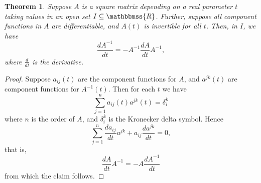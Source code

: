\documentclass[12pt]{article}
\newcommand{\R}{\mathbbmss{R}}
\newtheorem{thm}{Theorem}
\begin{document}
\begin{thm}
Suppose $A$ is a square matrix depending on a real parameter $t$
taking values in an open set $I\subseteq \R$. Further, suppose all
component functions in $A$ are differentiable, and $A(t)$ is invertible
for all $t$. Then, in $I$, we have
$$
   \frac{dA^{-1}}{dt}=-A^{-1} \frac{dA}{dt} A^{-1}, 
$$
where $\frac{d}{dt}$ is the derivative.
\end{thm}

\begin{proof}
Suppose $a_{ij}(t)$ are the component functions for $A$, 
and $a^{jk}(t)$ are component functions for $A^{-1}(t)$. Then 
for each $t$ we have 
$$
   \sum_{j=1}^n a_{ij}(t) a^{jk}(t)=\delta_i^k
$$
where $n$ is the order of $A$, and 
$\delta_i^k$ is the Kronecker delta symbol. Hence
$$
 \sum_{j=1}^n \frac{da_{ij}}{dt} a^{jk} + a_{ij}\frac{da^{jk}}{dt} = 0,
$$
that is, 
$$
  \frac{dA}{dt} A^{-1} = - A \frac{dA^{-1}}{dt}
$$
from which the claim follows. 
\end{proof}
\end{document}
